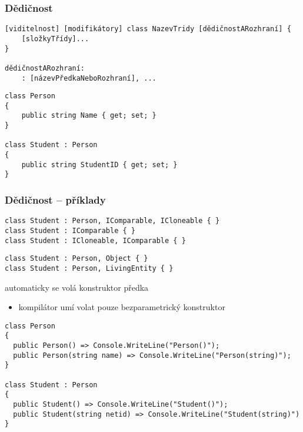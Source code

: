 \begin{frame}[fragile]
\frametitle{Dědičnost}
\begin{noteblock}{}
\begin{lstlisting}[basicstyle=\small]
[viditelnost] [modifikátory] class NazevTridy [dědičnostARozhraní] { 
	[složkyTřídy]...
}

dědičnostARozhraní:
	: [názevPředkaNeboRozhraní], ...
\end{lstlisting}
\end{noteblock}
\vfill
\begin{yesblock}
\begin{lstlisting}[basicstyle=\small]
class Person
{
    public string Name { get; set; }
}

class Student : Person
{
    public string StudentID { get; set; }
}
\end{lstlisting}
\end{yesblock}
\end{frame}



\begin{frame}[fragile]
\frametitle{Dědičnost -- příklady}
\begin{yesblock}
\begin{lstlisting}[basicstyle=\small]
class Student : Person, IComparable, ICloneable { }
class Student : IComparable { }
class Student : ICloneable, IComparable { }
\end{lstlisting}
\end{yesblock}
\vfill
\begin{noblock}
\begin{lstlisting}[basicstyle=\small]
class Student : Person, Object { }
class Student : Person, LivingEntity { }
\end{lstlisting}
\end{noblock}
\end{frame}



\begin{frame}[fragile]
\vfill
\begin{bitemize}{}
\item automaticky se volá konstruktor předka
\begin{itemize}
\item kompilátor umí volat pouze bezparametrický konstruktor
\end{itemize}
\end{bitemize}
\vfill
\begin{yesblock}
\begin{lstlisting}[basicstyle=\small]
class Person
{
  public Person() => Console.WriteLine("Person()");
  public Person(string name) => Console.WriteLine("Person(string)");
}

class Student : Person
{
  public Student() => Console.WriteLine("Student()");
  public Student(string netid) => Console.WriteLine("Student(string)")
}
\end{lstlisting}
\end{yesblock}
\vfill
\end{frame}


